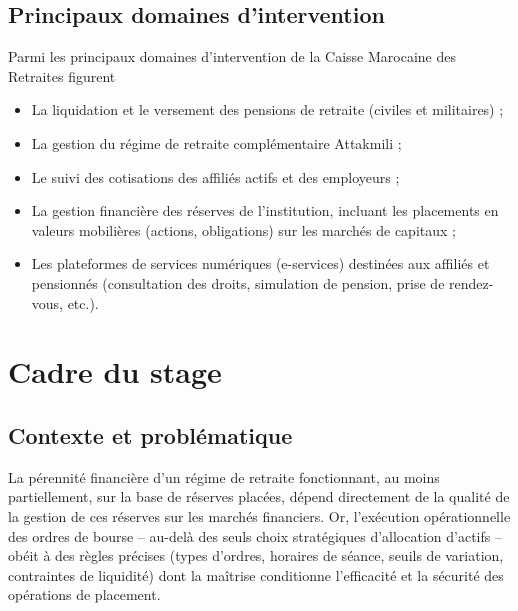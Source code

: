 \documentclass{rapportENSIAS} %
\begin{document}
\section{Principaux domaines d'intervention}

\noindent
Parmi les principaux domaines d'intervention de la Caisse Marocaine des Retraites figurent \newline

\begin{itemize}
    \item La liquidation et le versement des pensions de retraite (civiles et militaires) ;
    \item La gestion du régime de retraite complémentaire Attakmili ;
    \item Le suivi des cotisations des affiliés actifs et des employeurs ;
    \item La gestion financière des réserves de l'institution, incluant les placements en valeurs mobilières (actions, obligations) sur les marchés de capitaux ;
    \item Les plateformes de services numériques (e-services) destinées aux affiliés et pensionnés (consultation des droits, simulation de pension, prise de rendez-vous, etc.).
\end{itemize}


\chapter{Cadre du stage}

\section{Contexte et problématique}

\noindent
La pérennité financière d'un régime de retraite fonctionnant, au moins partiellement, sur la base de réserves placées, dépend directement de la qualité de la gestion de ces réserves sur les marchés financiers. Or, l'exécution opérationnelle des ordres de bourse -- au-delà des seuls choix stratégiques d'allocation d'actifs -- obéit à des règles précises (types d'ordres, horaires de séance, seuils de variation, contraintes de liquidité) dont la maîtrise conditionne l'efficacité et la sécurité des opérations de placement.
\end{document}
